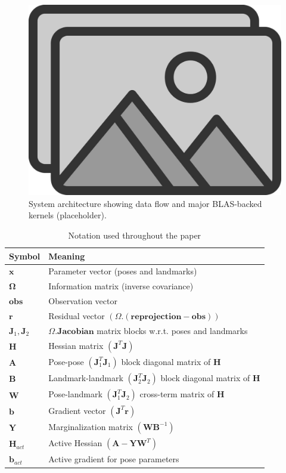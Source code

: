 \begin{figure}[t]
  \centering
  \includegraphics[width=\linewidth]{figs/placeholder}
  \caption{System architecture showing data flow and major BLAS-backed kernels (placeholder).}
  \label{fig:overview_arch}
\end{figure}

\begin{table}[b]
  \caption{Notation used throughout the paper}
  \label{tab:overview_notation}
  \centering
  \begin{tabular}{@{}ll@{}}
    \toprule
    Symbol & Meaning \\ \midrule
    $\mathbf{x}$ & Parameter vector (poses and landmarks) \\
    $\boldsymbol{\Omega}$ & Information matrix (inverse covariance) \\
    $\boldsymbol{obs}$ & Observation vector \\
    $\mathbf{r}$ & Residual vector $(\Omega .( \mathbf{reprojection} - \mathbf{obs}))$ \\
    $\mathbf{J}_1, \mathbf{J}_2$ & $\Omega . \mathbf{Jacobian}$ matrix blocks w.r.t. poses and landmarks \\
    $\mathbf{H}$ & Hessian matrix $(\mathbf{J}^T \mathbf{J})$ \\
    $\mathbf{A}$ & Pose-pose $(\mathbf{J}_1^T \mathbf{J}_1)$ block diagonal matrix of $\mathbf{H}$ \\
    $\mathbf{B}$ & Landmark-landmark $(\mathbf{J}_2^T \mathbf{J}_2)$ block diagonal matrix of $\mathbf{H}$ \\
    $\mathbf{W}$ & Pose-landmark $(\mathbf{J}_1^T \mathbf{J}_2)$ cross-term matrix of $\mathbf{H}$ \\
    $\mathbf{b}$ & Gradient vector $(\mathbf{J}^T \mathbf{r})$ \\
    $\mathbf{Y}$ & Marginalization matrix $(\mathbf{W} \mathbf{B}^{-1})$ \\
    $\mathbf{H}_{act}$ & Active Hessian $(\mathbf{A} - \mathbf{Y} \mathbf{W}^T)$ \\
    $\mathbf{b}_{act}$ & Active gradient for pose parameters \\
    \bottomrule
  \end{tabular}
\end{table}

